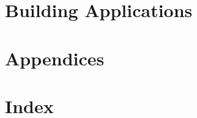 \documentclass{report}          %
\begin{document}
\part{Building Applications}





\part{Appendices}
\appendix







\part{Index}
\printindex
\end{document}
